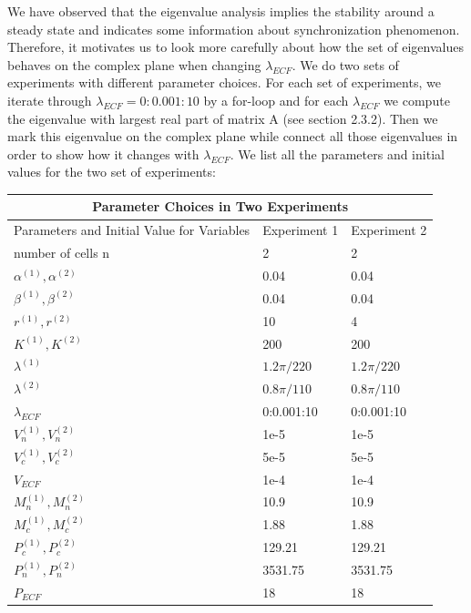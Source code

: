 \documentclass[12pt]{article}
\renewcommand{\(}{\left (}
\renewcommand{\)}{\right )}
\begin{document}
\hspace{5mm} We have observed that the eigenvalue analysis implies the stability around a steady state and indicates some information about synchronization phenomenon. Therefore, it motivates us to look more carefully about how the set of eigenvalues behaves on the complex plane when changing $\lambda_{ECF}$. We do two sets of experiments with different parameter choices. For each set of experiments, we iterate through $\lambda_{ECF} = 0:0.001:10$ by a for-loop and for each $\lambda_{ECF}$ we compute the eigenvalue with largest real part of matrix A (see section 2.3.2). Then we mark this eigenvalue on the complex plane while connect all those eigenvalues in order to show how it changes with $\lambda_{ECF}$. We list all the parameters and initial values for the two set of experiments: \\

\begin{center}
\begin{tabular}{ |p{4cm}||p{3.5cm}|p{3.5cm}|  }

 \hline
 \multicolumn{3}{|c|}{Parameter Choices in Two Experiments} \\
 \hline
 Parameters and Initial Value for Variables& Experiment 1& Experiment 2\\
 \hline
 number of cells n& 2 & 2\\
 $\alpha^{(1)}, \alpha^{(2)}$& 0.04 & 0.04\\
 $\beta^{(1)}, \beta^{(2)}$& 0.04 & 0.04\\
 $r^{(1)}, r^{(2)}$& 10 & 4\\
 $K^{(1)}, K^{(2)}$& 200 & 200\\
 $\lambda^{(1)}$& ${1.2\pi}/{220}$ & ${1.2\pi}/{220}$\\
 $\lambda^{(2)}$& ${0.8\pi}/{110}$ & ${0.8\pi}/{110}$\\
 $\lambda_{ECF}$& 0:0.001:10 & 0:0.001:10\\
 $V_n^{(1)}, V_n^{(2)}$& 1e-5 & 1e-5\\
 $V_c^{(1)}, V_c^{(2)}$& 5e-5 & 5e-5\\
 $V_{ECF}$& 1e-4 & 1e-4\\
 $M_n^{(1)}, M_n^{(2)}$& 10.9 & 10.9\\
 $M_c^{(1)}, M_c^{(2)}$& 1.88 & 1.88\\
 $P_c^{(1)}, P_c^{(2)}$& 129.21 & 129.21\\
 $P_n^{(1)}, P_n^{(2)}$& 3531.75 & 3531.75\\
 $P_{ECF}$& 18 & 18\\
 \hline
\end{tabular}
\end{center}
\end{document}
